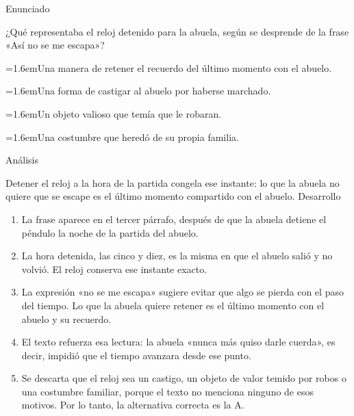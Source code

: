 \documentclass[10pt,a4paper,twocolumn]{article}
\newcommand{\alternativa}[2]{\par\noindent\hangindent=1.6em\hangafter=1\makebox[1.6em][l]{\tecla{#1}}#2\par}
\newcommand{\clave}[1]{\par\smallskip{\sffamily\footnotesize\color{esmeralda} Clave \teclaok{#1}}\par}
\begin{document}
\begin{ejemplo}
{\sffamily\footnotesize\color{zinc500} Enunciado}\par
¿Qué representaba el reloj detenido para la abuela, según se desprende de la frase «Así no se me escapa»?
\alternativa{A}{Una manera de retener el recuerdo del último momento con el abuelo.}
\alternativa{B}{Una forma de castigar al abuelo por haberse marchado.}
\alternativa{C}{Un objeto valioso que temía que le robaran.}
\alternativa{D}{Una costumbre que heredó de su propia familia.}
\clave{A}
{\sffamily\footnotesize\color{zinc500} Análisis}\par Detener el reloj a la hora de la partida congela ese instante: lo que la abuela no quiere que se escape es el último momento compartido con el abuelo.
{\sffamily\footnotesize\color{zinc500} Desarrollo}
\begin{enumerate}
  \item La frase aparece en el tercer párrafo, después de que la abuela detiene el péndulo la noche de la partida del abuelo.
  \item La hora detenida, las cinco y diez, es la misma en que el abuelo salió y no volvió. El reloj conserva ese instante exacto.
  \item La expresión «no se me escapa» sugiere evitar que algo se pierda con el paso del tiempo. Lo que la abuela quiere retener es el último momento con el abuelo y su recuerdo.
  \item El texto refuerza esa lectura: la abuela «nunca más quiso darle cuerda», es decir, impidió que el tiempo avanzara desde ese punto.
  \item Se descarta que el reloj sea un castigo, un objeto de valor temido por robos o una costumbre familiar, porque el texto no menciona ninguno de esos motivos. Por lo tanto, la alternativa correcta es la A.
\end{enumerate}
\end{ejemplo}
\end{document}

